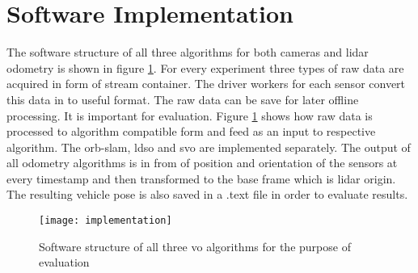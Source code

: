\section{Software Implementation}
The software structure of all three algorithms for both cameras and \acrshort{lidar} odometry is shown in figure \ref{fig:implementation}. For every experiment three types of raw data are acquired in form of stream container. The driver workers for each sensor convert this data in to useful format. The raw data can be save for later offline processing. It is important for evaluation. Figure \ref{fig:implementation} shows how raw data is processed to algorithm compatible form and feed as an input to respective algorithm. The \acrshort{orb}-\acrshort{slam}, \acrshort{ldso} and \acrshort{svo} are implemented separately. The output of all odometry algorithms is in from of position and orientation of the sensors at every timestamp and then transformed to the base frame which is \acrshort{lidar} origin. The resulting vehicle pose is also saved in a .text file in order to evaluate results.
\begin{figure}[H]
	\centering
	\texttt{[image: implementation]}
	\caption{Software structure of all three \acrshort{vo} algorithms for the purpose of evaluation}
	\label{fig:implementation}
\end{figure}

